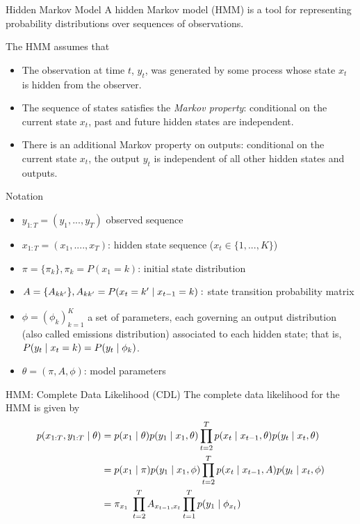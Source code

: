 \documentclass[10pt]{beamer}
\begin{document}
\begin{frame}{Hidden Markov Model}
A  hidden Markov model (HMM) is a tool for representing probability distributions over sequences of observations.  

The HMM assumes that 
\begin{itemize}
\item The observation at time $t$, $y_t$, was generated by some process whose state $x_t$ is hidden from the observer. 
\item The sequence of states satisfies the \textit{Markov property}:  conditional on the current state $x_t$, past and future hidden states are independent. 
\item There is an additional Markov property on outputs:  conditional on the current state $x_t$, the output $y_t$ is independent of all other hidden states and outputs.
\end{itemize}

\end{frame}

\begin{frame}{Notation}
\begin{itemize}
\item $y_{1:T}=(y_1, ..., y_T)$ observed sequence
\item $x_{1:T} =(x_1, ...., x_T)$: hidden state sequence ($x_t \in \{1,...,K \}$) 
\item $\pi = \{ \pi_k \}, \pi_k = P(x_1 = k)$: initial state distribution
\item $A=\{A_{kk'}\}, A_{kk'} = P(x_t= k' \; | \; x_{t-1}=k):$ state transition probability matrix 
\item $\phi = (\phi_k)_{k=1}^K$ a set of parameters, each governing an output distribution (also called emissions distribution) associated to each hidden state; that is, $ P(y_t \; | \; x_t=k) = P(y_t \; | \; \phi_k)$. 
\item $\theta = (\pi, A, \phi)$: model parameters
\end{itemize}
\end{frame}


\begin{frame}{HMM: Complete Data Likelihood (CDL) }
The complete data likelihood for the HMM is given by 
\begin{align}
 p(x_{1:T}, y_{1:T} \; | \; \theta) &=  p(x_1 \; | \; \theta)  p(y_1 \; | \; x_1, \theta) \displaystyle\prod_{t=2}^T p(x_t \; | \; x_{t-1}, \theta) p(y_t \; | \; x_t, \theta) \nonumber \\
 &=  p(x_1 \; | \; \pi) p(y_1 \; | \; x_1, \phi) \displaystyle\prod_{t=2}^T p(x_t \; | \; x_{t-1}, A) p(y_t \; | \; x_t, \phi)   \nonumber \\
 &= \pi_{x_1}  \; \displaystyle\prod_{t=2}^T A_{x_{t-1}, x_t} \displaystyle\prod_{t=1}^T p(y_1 \; | \; \phi_{x_t}) \label{eqn:hmm_cdl_compact}
 \end{align}
\end{frame}
\end{document}
